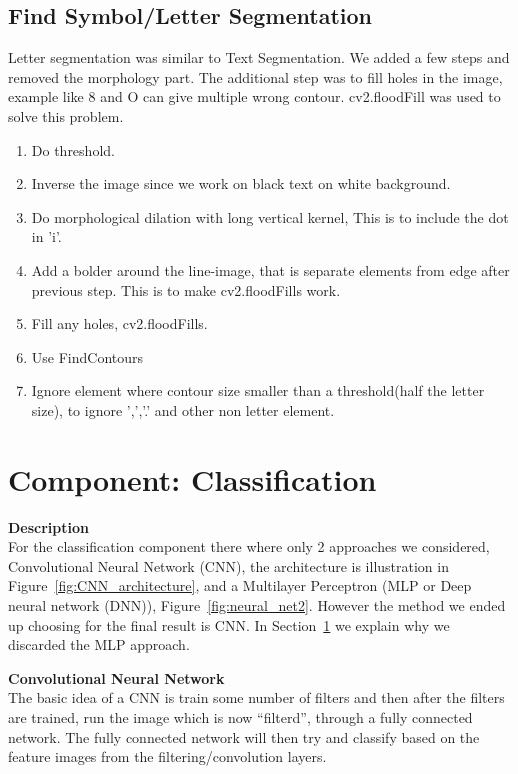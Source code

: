 \documentclass[Report.tex]{subfiles}
\begin{document}
\subsection{Find Symbol/Letter Segmentation}\label{subsec:Find_Symb}
Letter segmentation was similar to Text Segmentation. We added a few steps and removed the morphology part. The additional step was to fill holes in the image, example like 8 and O can give multiple wrong contour. cv2.floodFill was used to solve this problem. 
\begin{enumerate}
  \item Do threshold.
  \item Inverse the image since we work on black text on white background.
  \item Do morphological dilation with long vertical kernel, This is to include the dot in 'i'.
  \item Add a bolder around the line-image, that is separate elements from edge after previous step. This is to make cv2.floodFills work. 
  \item Fill any holes, cv2.floodFills.
  \item Use FindContours
  \item Ignore element where contour size smaller than a threshold(half the letter size), to ignore ',','.' and other non letter element. 
\end{enumerate}


\section{Component: Classification}
\label{Method:Classification}
\begin{flushleft}
  \textbf{Description} \\
  For the classification component there where only 2 approaches we considered,
  Convolutional Neural Network (CNN), the architecture is illustration in
  Figure~\ref{fig:CNN_architecture}, and a Multilayer Perceptron (MLP or Deep
  neural network (DNN)), Figure~\ref{fig:neural_net2}. However the method we ended up choosing for the final result is CNN. In
  Section~\ref{Method:Classification} we explain why we discarded
  the MLP approach. \par
\end{flushleft}

\begin{flushleft}
  \textbf{Convolutional Neural Network} \\
  The basic idea of a CNN is train some number of filters and then
  after the filters are trained, run the image which is now ``filterd'', through
  a fully connected network. The fully connected network will then try and
  classify based on the feature images from the filtering/convolution layers. \par
\end{flushleft}
\end{document}
